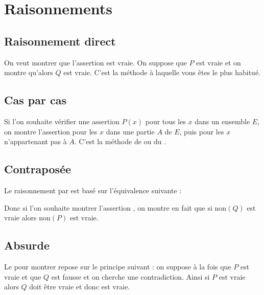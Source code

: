 \documentclass[11pt,class=report,crop=false]{standalone}
\begin{document}
\section{Raisonnements}

\subsection{Raisonnement direct}
On veut montrer que l'assertion  est vraie.
On suppose que $P$ est vraie et on montre qu'alors $Q$ est vraie.
C'est la méthode à laquelle vous êtes le plus habitué.



\subsection{Cas par cas}

Si l'on souhaite vérifier une assertion $P(x)$ pour tous les $x$ dans un ensemble $E$, on
montre l'assertion pour les $x$ dans une partie $A$ de $E$, puis pour les $x$
n'appartenant pas à $A$. C'est la méthode de  ou du .



\subsection{Contraposée}

Le raisonnement par  est basé sur l'équivalence suivante :

Donc si l'on souhaite montrer l'assertion , on montre en fait
que si $\text{non}(Q)$ est vraie alors $\text{non}(P)$ est vraie.




\subsection{Absurde}

Le  pour montrer   repose sur le principe suivant :
on suppose à la fois que $P$ est vraie et que $Q$ est fausse et on cherche une contradiction.
Ainsi si $P$ est vraie alors $Q$ doit être vraie et donc  est vraie.
\end{document}
